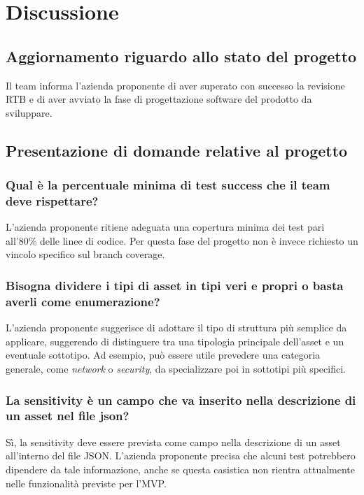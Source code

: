 \documentclass[a4paper,12pt]{article}
\begin{document}
\section{Discussione}{

\subsection{Aggiornamento riguardo allo stato del progetto}
    Il team informa l'azienda proponente di aver superato con successo la revisione RTB e di aver avviato la fase di progettazione software del prodotto da sviluppare.

\subsection{Presentazione di domande relative al progetto}
    \subsubsection{Qual è la percentuale minima di test success che il team deve rispettare?}
        L'azienda proponente ritiene adeguata una copertura minima dei test pari all'80\% delle linee di codice. Per questa fase del progetto non è invece richiesto un vincolo specifico sul branch coverage.

    \subsubsection{Bisogna dividere i tipi di asset in tipi veri e propri o basta averli come enumerazione?}
        L'azienda proponente suggerisce di adottare il tipo di struttura più semplice da applicare, suggerendo di distinguere tra una tipologia principale dell'asset e un eventuale sottotipo. Ad esempio, può essere utile prevedere una categoria generale, come \textit{network} o \textit{security}, da specializzare poi in sottotipi più specifici.

    \subsubsection{La sensitivity è un campo che va inserito nella descrizione di un asset nel file json?}
        Sì, la sensitivity deve essere prevista come campo nella descrizione di un asset all'interno del file JSON. L'azienda proponente precisa che alcuni test potrebbero dipendere da tale informazione, anche se questa casistica non rientra attualmente nelle funzionalità previste per l'MVP.

}
\end{document}
